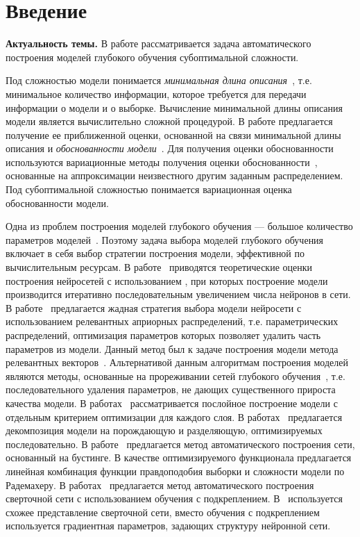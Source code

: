 \newpage{}
\chapter*{Введение}


\textbf{Актуальность темы.} В работе рассматривается задача автоматического построения моделей глубокого обучения субоптимальной сложности. 

Под сложностью модели понимается \emph{минимальная длина описания}~\cite{mdl}, т.е. минимальное количество информации, которое требуется для передачи информации о модели и о выборке. Вычисление минимальной длины описания модели является вычислительно сложной процедурой. В работе предлагается получение ее приближенной оценки, основанной на связи минимальной длины описания и \emph{обоснованности модели}~\cite{mdl}. Для получения оценки обоснованности используются вариационные методы получения оценки обоснованности~\cite{bishop}, основанные на аппроксимации неизвестного другим заданным распределением. Под субоптимальной сложностью понимается вариационная оценка обоснованности модели.

Одна из проблем построения моделей глубокого обучения --- большое количество параметров моделей~\cite{hinton_rbm, hinton_init}. Поэтому задача выбора моделей глубокого обучения включает в себя выбор стратегии построения модели, эффективной по вычислительным ресурсам. В работе~\cite{greed} приводятся теоретические оценки построения нейросетей с использованием ,  при которых построение модели производится итеративно последовательным увеличением числа нейронов в сети. В работе~\cite{greed_mlp} предлагается жадная стратегия выбора модели нейросети с использованием релевантных априорных распределений, т.е. параметрических распределений, оптимизация параметров которых позволяет удалить часть параметров из модели. Данный метод был к задаче построения модели метода релевантных векторов~\cite{rvm}. Альтернативой данным алгоритмам построения моделей являются методы, основанные на прореживании сетей глубокого обучения~\cite{obd, popova, nvidia_prune}, т.е. последовательного удаления параметров, не дающих существенного прироста качества модели. 
В работах~\cite{Bengio, hd} рассматривается послойное построение модели с отдельным критерием оптимизации для каждого слоя. В работах~\cite{Kingma, gendis_pictures, gendis_phd} предлагается декомпозиция модели на порождающую и разделяющую, оптимизируемых последовательно. В работе~\cite{adanet} предлагается метод автоматического построения сети, основанный на бустинге. В качестве оптимизируемого функционала предлагается линейная комбинация функции правдоподобия выборки и сложности модели по Радемахеру. 
В работах~\cite{reinf,reinf_predict,reinf_deep2net,reinf_transfer} предлагается метод автоматического построения сверточной сети с использованием обучения с подкреплением. В~\cite{darts} используется схожее представление сверточной сети, вместо обучения с подкреплением используется градиентная параметров, задающих структуру нейронной сети.

